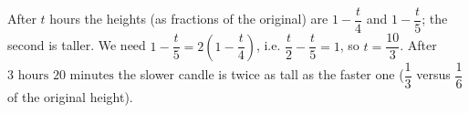 After $t$ hours the heights (as fractions of the original) are $1-\dfrac {t}{4}$ and $1-\dfrac {t}{5}$; the second is taller. We need $1-\dfrac {t}{5}=2\left(1-\dfrac {t}{4}\right)$, i.e. $\dfrac {t}{2}-\dfrac {t}{5}=1$, so $t=\dfrac{10}{3}$. After $\boxed{3\text{ hours }20\text{ minutes}}$ the slower candle is twice as tall as the faster one ($\dfrac{1}{3}$ versus $\dfrac{1}{6}$ of the original height).
